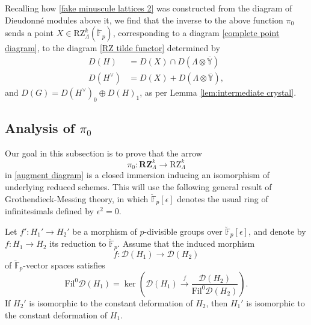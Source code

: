\documentclass[11pt]{alggeom}
\newcommand{\map}[1]{\xrightarrow{#1}}
\newcommand{\F}{\mathbb F}
\begin{document}
Recalling how \eqref{fake minuscule lattices 2} was constructed from the diagram of Dieudonn\'e modules above it, we find that 
the inverse to the above function $\pi_0$ sends a point $X \in \mathrm{RZ}_\Lambda^k(\breve{\F}_p)$, corresponding to a diagram \eqref{complete point diagram}, to the diagram \eqref{RZ tilde functor} determined by
\begin{align}\label{H intersection}
D(H) & = D(X) \cap  D( \Lambda \otimes \overline{\mathbb{Y}})   \\
D(H^\vee) & = D(X) +   D( \Lambda \otimes \overline{\mathbb{Y}}), \nonumber
\end{align}
and $D(G) = D(H^\vee)_0\oplus D(H)_1$, as per Lemma \ref{lem:intermediate crystal}.






\subsection{Analysis of $\pi_0$}



Our goal in this subsection is to prove that the  arrow 
\[
\pi_0 :  \mathbf{RZ}_\Lambda^k  \to  \mathrm{RZ}_\Lambda^k
\]
in \eqref{augment diagram} is a closed immersion  inducing an isomorphism of underlying reduced schemes.
This will use the following general result of Grothendieck-Messing theory, in which 
 $\breve{\F}_p[\epsilon]$ denotes the usual ring of infinitesimals defined by $\epsilon^2=0$.



\begin{lemma}\label{lem:easy deformation}
Let  $f' : H_1' \to H_2'$  be a morphism of $p$-divisible groups over  $\breve{\F}_p[\epsilon]$, and denote by   $f:H_1 \to H_2$ its reduction  to $\breve{\F}_p$.
Assume that the induced morphism
\[
 f : \mathscr{D} (H_1) \to \mathscr{D} (H_2)
\]
of $\breve{\F}_p$-vector spaces satisfies
\begin{equation}\label{easy def kernel}
\mathrm{Fil}^0 \mathscr{D} (H_1) = \ker \left( \mathscr{D} (H_1) \map{f} 
 \frac{ \mathscr{D}(H_2) }{   \mathrm{Fil}^0 \mathscr{D}(H_2) }  \right) .
\end{equation}
If   $H_2'$ is isomorphic to the constant deformation of $H_2$, then   $H_1'$ is isomorphic to the constant deformation of $H_1$.
\end{lemma}
\end{document}
